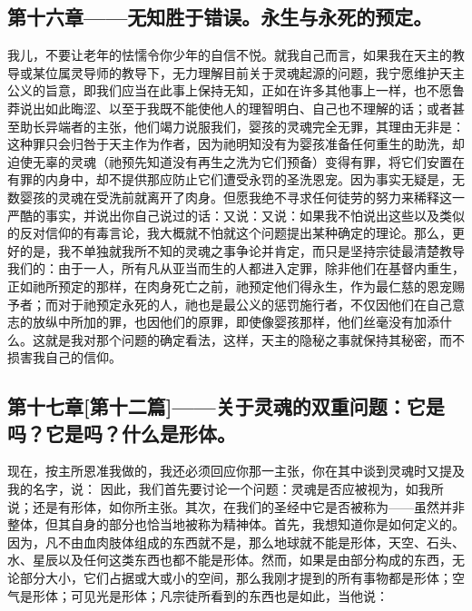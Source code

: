 
\subsection{第十六章——无知胜于错误。永生与永死的预定。}

我儿，不要让老年的怯懦令你少年的自信不悦。就我自己而言，如果我在天主的教导或某位属灵导师的教导下，无力理解目前关于灵魂起源的问题，我宁愿维护天主公义的旨意，即我们应当在此事上保持无知，正如在许多其他事上一样，也不愿鲁莽说出如此晦涩、以至于我既不能使他人的理智明白、自己也不理解的话；或者甚至助长异端者的主张，他们竭力说服我们，婴孩的灵魂完全无罪，其理由无非是：这种罪只会归咎于天主作为作者，因为祂明知没有为婴孩准备任何重生的助洗，却迫使无辜的灵魂（祂预先知道没有再生之洗为它们预备）变得有罪，将它们安置在有罪的内身中，却不提供那应防止它们遭受永罚的圣洗恩宠。因为事实无疑是，无数婴孩的灵魂在受洗前就离开了肉身。但愿我绝不寻求任何徒劳的努力来稀释这一严酷的事实，并说出你自己说过的话：又说：又说：如果我不怕说出这些以及类似的反对信仰的有毒言论，我大概就不怕就这个问题提出某种确定的理论。那么，更好的是，我不单独就我所不知的灵魂之事争论并肯定，而只是坚持宗徒最清楚教导我们的：由于一人，所有凡从亚当而生的人都进入定罪，除非他们在基督内重生，正如祂所预定的那样，在肉身死亡之前，祂预定他们得永生，作为最仁慈的恩宠赐予者；而对于祂预定永死的人，祂也是最公义的惩罚施行者，不仅因他们在自己意志的放纵中所加的罪，也因他们的原罪，即使像婴孩那样，他们丝毫没有加添什么。这就是我对那个问题的确定看法，这样，天主的隐秘之事就保持其秘密，而不损害我自己的信仰。\par


\subsection{第十七章[第十二篇]——关于灵魂的双重问题：它是吗？它是吗？什么是形体。}

现在，按主所恩准我做的，我还必须回应你那一主张，你在其中谈到灵魂时又提及我的名字，说： 因此，我们首先要讨论一个问题：灵魂是否应被视为，如我所说；还是有形体，如你所主张。其次，在我们的圣经中它是否被称为——虽然并非整体，但其自身的部分也恰当地被称为精神体。首先，我想知道你是如何定义的。因为，凡不由血肉肢体组成的东西就不是，那么地球就不能是形体，天空、石头、水、星辰以及任何这类东西也都不能是形体。然而，如果是由部分构成的东西，无论部分大小，它们占据或大或小的空间，那么我刚才提到的所有事物都是形体；空气是形体；可见光是形体；凡宗徒所看到的东西也是如此，当他说：\par

